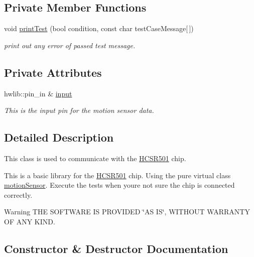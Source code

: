 \subsection*{Private Member Functions}
\begin{DoxyCompactItemize}
\item 
void \mbox{\hyperlink{class_h_c_s_r501_a062d325c62157cc2b82d4a092caee2a1}{print\+Test}} (bool condition, const char test\+Case\+Message\mbox{[}$\,$\mbox{]})
\begin{DoxyCompactList}\small\item\em print out any error of passed test message. \end{DoxyCompactList}\end{DoxyCompactItemize}
\subsection*{Private Attributes}
\begin{DoxyCompactItemize}
\item 
hwlib\+::pin\+\_\+in \& \mbox{\hyperlink{class_h_c_s_r501_a00d41bcf68fa634e07ae68488d2b61ee}{input}}
\begin{DoxyCompactList}\small\item\em This is the input pin for the motion sensor data. \end{DoxyCompactList}\end{DoxyCompactItemize}


\subsection{Detailed Description}
This class is used to communicate with the \mbox{\hyperlink{class_h_c_s_r501}{H\+C\+S\+R501}} chip. 

This is a basic library for the \mbox{\hyperlink{class_h_c_s_r501}{H\+C\+S\+R501}} chip. Using the pure virtual class \mbox{\hyperlink{classmotion_sensor}{motion\+Sensor}}. Execute the tests when you\textquotesingle{}re not sure the chip is connected correctly. \begin{DoxyWarning}{Warning}
T\+HE S\+O\+F\+T\+W\+A\+RE IS P\+R\+O\+V\+I\+D\+ED \char`\"{}\+A\+S I\+S\char`\"{}, W\+I\+T\+H\+O\+UT W\+A\+R\+R\+A\+N\+TY OF A\+NY K\+I\+ND. 
\end{DoxyWarning}


\subsection{Constructor \& Destructor Documentation}
\mbox{\label{class_h_c_s_r501_a589a13daf993e217138344db60086f36}} 
